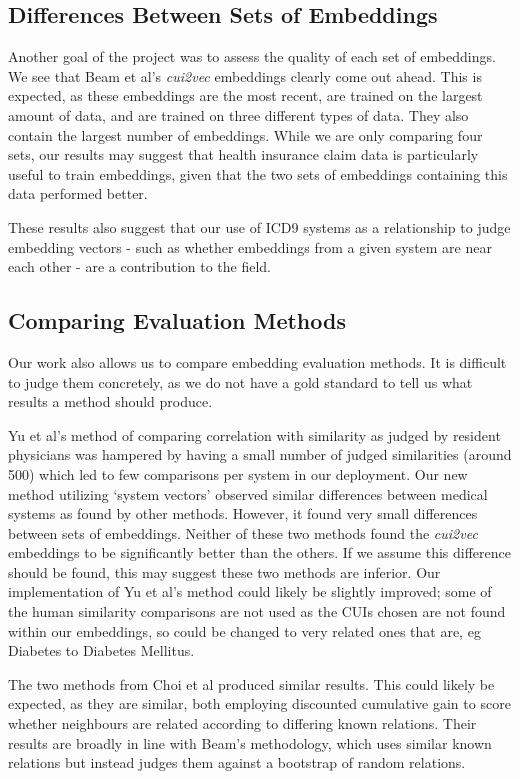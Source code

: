 \documentclass[11pt,a4paper]{article}
\begin{document}
\subsection{Differences Between Sets of Embeddings}

Another goal of the project was to assess the quality of each set of embeddings. We see that Beam et al's \emph{cui2vec} embeddings clearly come out ahead. This is expected, as these embeddings are the most recent, are trained on the largest amount of data, and are trained on three different types of data. They also contain the largest number of embeddings. While we are only comparing four sets, our results may suggest that health insurance claim data is particularly useful to train embeddings, given that the two sets of embeddings containing this data performed better. 

These results also suggest that our use of ICD9 systems as a relationship to judge embedding vectors - such as whether embeddings from a given system are near each other - are a contribution to the field. 


\subsection{Comparing Evaluation Methods}
Our work also allows us to compare embedding evaluation methods. It is difficult to judge them concretely, as we do not have a gold standard to tell us what results a method should produce.

Yu et al's method of comparing correlation with similarity as judged by resident physicians was hampered by having a small number of judged similarities (around 500) which led to few comparisons per system in our deployment. Our new  method utilizing `system vectors' observed similar differences between medical systems as found by other methods. However, it found very small differences between sets of embeddings. Neither of these two methods found the \emph{cui2vec} embeddings to be significantly better than the others. If we assume this difference should be found, this may suggest these two methods are inferior. Our implementation of Yu et al's method could likely be slightly improved; some of the human similarity comparisons are not used as the CUIs chosen are not found within our embeddings, so could be changed to very related ones that are, eg Diabetes to Diabetes Mellitus.  

The two methods from Choi et al produced similar results. This could likely be expected, as they are similar, both employing discounted cumulative gain to score whether neighbours are related according to differing known relations. Their results are broadly in line with Beam's methodology, which uses similar known relations but instead judges them against a bootstrap of random relations. 
\end{document}
